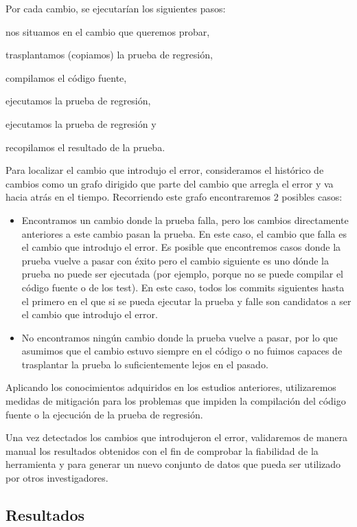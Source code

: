 Por cada cambio, se ejecutarían los siguientes pasos:
\begin{inparaenum}[\bf(1)]
    \item nos situamos en el cambio que queremos probar,
    \item trasplantamos (copiamos) la prueba de regresión,
    \item compilamos el código fuente,
    \item ejecutamos la prueba de regresión,
    \item ejecutamos la prueba de regresión y
    \item recopilamos el resultado de la prueba.
\end{inparaenum}

Para localizar el cambio que introdujo el error, consideramos el histórico de cambios como un grafo dirigido que parte del cambio que arregla el error y va hacia atrás en el tiempo. 
Recorriendo este grafo encontraremos 2 posibles casos:
\begin{itemize}
    \item Encontramos un cambio donde la prueba falla, pero los cambios directamente anteriores a este cambio pasan la prueba. En este caso, el cambio que falla es el cambio que introdujo el error. Es posible que encontremos casos donde la prueba vuelve a pasar con éxito pero el cambio siguiente es uno dónde la prueba no puede ser ejecutada (por ejemplo, porque no se puede compilar el código fuente o de los test). En este caso, todos los commits siguientes hasta el primero en el que si se pueda ejecutar la prueba y falle son candidatos a ser el cambio que introdujo el error.
    \item No encontramos ningún cambio donde la prueba vuelve a pasar, por lo que asumimos que el cambio estuvo siempre en el código o no fuimos capaces de trasplantar la prueba lo suficientemente lejos en el pasado.
\end{itemize}

Aplicando los conocimientos adquiridos en los estudios anteriores, utilizaremos medidas de mitigación para los problemas que impiden la compilación del código fuente o la ejecución de la prueba de regresión.

Una vez detectados los cambios que introdujeron el error, validaremos de manera manual los resultados obtenidos con el fin de comprobar la fiabilidad de la herramienta y para generar un nuevo conjunto de datos que pueda ser utilizado por otros investigadores.

\subsection{Resultados}

